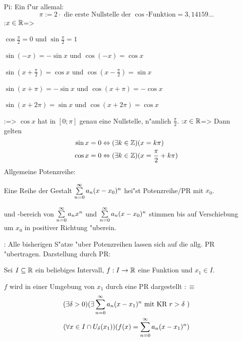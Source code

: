  Pi:{
  Ein f"ur allemal:
  \[\pi:=\text{$2\cdot$ die erste Nullstelle der $\cos$-Funktion}=3,14159...
    \]
  }
\theorem:$x\in\mathbb R$=>{
  \begin{stmts}
    \item $\cos \frac \pi 2=0$ und $\sin \frac \pi 2=1$
    \item $\sin (-x)=-\sin x$ und $\cos (-x)=\cos x$
    \item $\sin (x+\frac \pi 2)=\cos x$ und $\cos (x-\frac \pi 2)=\sin x$
    \item $\sin (x+\pi)=-\sin x$ und $\cos (x+\pi)=-\cos x$
    \item $\sin (x+2\pi)=\sin x$ und $\cos (x+2\pi)=\cos x$
    \end{stmts}
  }
\theorem:=>{
  $\cos x$ hat in $[0;\pi]$ genau eine Nullstelle, n"amlich $\frac \pi 2$.
  }
\theorem:$x\in\mathbb R$=>{
  Dann gelten
  \begin{align*}
    \sin x=0 &\Leftrightarrow (\exists k\in\mathbb Z)(x=k\pi) \\
    \cos x=0 &\Leftrightarrow (\exists k\in\mathbb Z)(x=\frac \pi 2+k\pi)
    \end{align*}
  }
 Allgemeine Potenzreihe:{
  Eine Reihe der Gestalt $\sumn 0 a_n(x-x_0)^n$ hei"st Potenzreihe/PR mit
   $x_0$.\par
   und -bereich von 
  $\sumn 0 a_n x^n$ und $\sumn 0 a_n (x-x_0)^n$
  stimmen bis auf Verschiebung um $x_0$ in positiver Richtung "uberein.
  }
\remark:{ 
  Alle bisherigen S"atze "uber Potenzreihen lassen sich auf
  die allg. PR "ubertragen.
  }
 Darstellung durch PR:{
  Sei $I\subseteq\mathbb R$ ein beliebiges Intervall, $f:I\to\mathbb R$ eine Funktion und
  $x_1\in I$.
  
  $f$ wird in einer Umgebung von $x_1$ durch eine PR dargestellt $:\equiv$
  \begin{multline*}
    (\exists \delta>0)
    (\exists \sumn 0 a_n (x-x_1)^n\text{ mit KR $r>\delta$ })\\
    (\forall x\in I\cap U_\delta(x_1))
    (f(x)=\sumn 0 a_n (x-x_1)^n)
    \end{multline*}
  }

